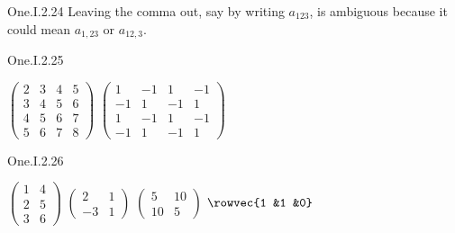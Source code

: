 \begin{ans}{One.I.2.24}
       Leaving the comma out, say by writing \( a_{123} \),
       is ambiguous because it could mean $a_{1,23}$ or $a_{12,3}$.
    
\end{ans}
\begin{ans}{One.I.2.25}
      \begin{exparts*}
        \partsitem \(
           \begin{pmatrix}
             2  &3  &4  &5  \\
             3  &4  &5  &6  \\
             4  &5  &6  &7  \\
             5  &6  &7  &8
           \end{pmatrix} \)
        \partsitem \(
           \begin{pmatrix}
             1  &-1  &1   &-1  \\
            -1  &1   &-1  &1  \\
             1  &-1  &1   &-1  \\
            -1  &1   &-1  &1
           \end{pmatrix} \)
      \end{exparts*}
    
\end{ans}
\begin{ans}{One.I.2.26}
      \begin{exparts*}
        \partsitem \( \begin{pmatrix}
                   1  &4  \\
                   2  &5  \\
                   3  &6
                 \end{pmatrix}  \)
        \partsitem \( \begin{pmatrix}
                   2  &1  \\
                  -3  &1
                 \end{pmatrix}  \)
        \partsitem \( \begin{pmatrix}
                   5  &10 \\
                  10  &5
                 \end{pmatrix}  \)
        \partsitem \( \rowvec{1 &1 &0}  \)
      \end{exparts*}
     
\end{ans}
